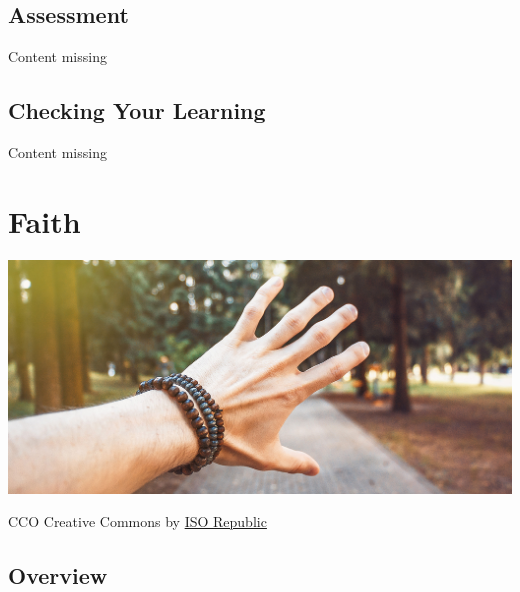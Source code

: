 \documentclass[
]{book}
\begin{document}
\hypertarget{assessment-1}{%
\section*{Assessment}\label{assessment-1}}

{Content missing}

\hypertarget{checking-your-learning}{%
\section*{Checking Your Learning}\label{checking-your-learning}}

{Content missing}

\hypertarget{faith}{%
\chapter{Faith}\label{faith}}

\includegraphics{assets/u3/Unit3Overview.jpg}

CCO Creative Commons by \href{https://isorepublic.com/photo/hand-reach/}{ISO Republic}

\hypertarget{overview-2}{%
\section{Overview}\label{overview-2}}
\end{document}
